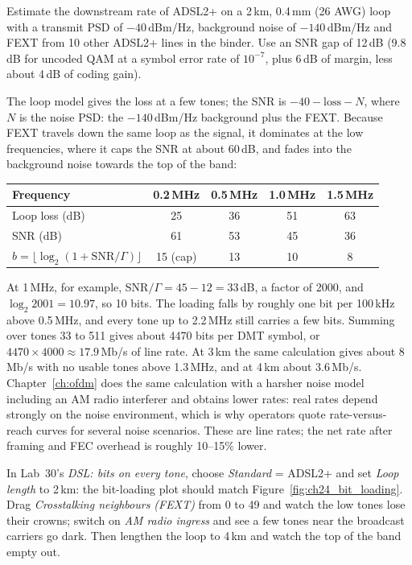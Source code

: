 \begin{worked}
Estimate the downstream rate of ADSL2+ on a 2\,km, 0.4\,mm (26 AWG) loop with a transmit PSD of
$-40$\,dBm/Hz, background noise of $-140$\,dBm/Hz and FEXT from 10 other ADSL2+ lines in the binder.
Use an SNR gap of 12\,dB (9.8\,dB for uncoded QAM at a symbol error rate of $10^{-7}$, plus 6\,dB of
margin, less about 4\,dB of coding gain).

The loop model gives the loss at a few tones; the SNR is $-40-\text{loss}-N$, where $N$ is the noise
PSD: the $-140$\,dBm/Hz background plus the FEXT. Because FEXT travels down the same loop as the
signal, it dominates at the low frequencies, where it caps the SNR at about 60\,dB, and fades into
the background noise towards the top of the band:
\begin{center}\small
\begin{tabular}{@{}lcccc@{}}
\toprule
Frequency & 0.2\,MHz & 0.5\,MHz & 1.0\,MHz & 1.5\,MHz\\
\midrule
Loop loss (dB) & 25 & 36 & 51 & 63\\
SNR (dB) & 61 & 53 & 45 & 36\\
$b=\lfloor\log_2(1+\text{SNR}/\Gamma)\rfloor$ & 15 (cap) & 13 & 10 & 8\\
\bottomrule
\end{tabular}
\end{center}
At 1\,MHz, for example, SNR$/\Gamma=45-12=33$\,dB, a factor of 2000, and $\log_2 2001=10.97$, so 10
bits. The loading falls by roughly one bit per 100\,kHz above 0.5\,MHz, and every tone up to 2.2\,MHz
still carries a few bits. Summing over tones 33 to 511 gives about 4470 bits per DMT symbol,
or $4470\times4000\approx17.9$\,Mb/s of line rate. At 3\,km the same calculation gives about 8\,Mb/s
with no usable tones above 1.3\,MHz, and at 4\,km about 3.6\,Mb/s. Chapter~\ref{ch:ofdm} does the
same calculation with a harsher noise model including an AM radio interferer and obtains lower
rates: real rates depend strongly on the noise environment, which is why operators quote
rate-versus-reach curves for several noise scenarios. These are line rates; the net rate after
framing and FEC overhead is roughly 10--15\% lower.
\end{worked}

\begin{tryit}
In Lab~30's \emph{DSL: bits on every tone}, choose \emph{Standard} = ADSL2+ and set \emph{Loop
length} to 2\,km: the bit-loading plot should match Figure~\ref{fig:ch24_bit_loading}. Drag
\emph{Crosstalking neighbours (FEXT)} from 0 to 49 and watch the low tones lose their crowns; switch
on \emph{AM radio ingress} and see a few tones near the broadcast carriers go dark. Then lengthen
the loop to 4\,km and watch the top of the band empty out.
\end{tryit}

